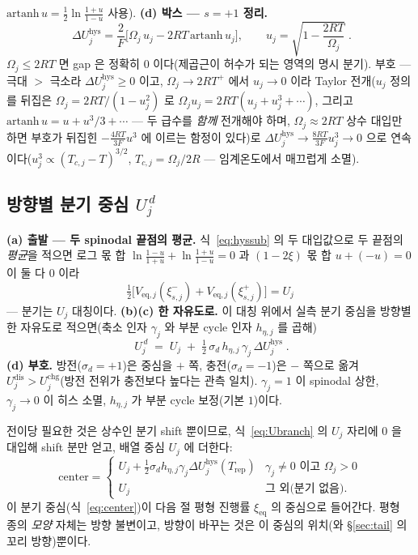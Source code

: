 \documentclass[11pt,a4paper]{article}
\newcommand{\eq}{\mathrm{eq}}
\newcommand{\dis}{\mathrm{dis}}
\newcommand{\chg}{\mathrm{chg}}
\newcommand{\hys}{\mathrm{hys}}
\newcommand{\rep}{\mathrm{rep}}
\begin{document}
$\mathrm{artanh}\,u=\tfrac12\ln\tfrac{1+u}{1-u}$ 사용). \textbf{(d) 박스 — $s=+1$ 정리.}
\begin{equation}
\boxed{\;\Delta U_j^\hys
=\frac{2}{F}\Big[\Omega_j\,u_j-2RT\,\mathrm{artanh}\,u_j\Big],
\qquad u_j=\sqrt{1-\frac{2RT}{\Omega_j}}\;.}
\label{eq:dUhys}
\end{equation}
$\Omega_j\le2RT$ 면 gap 은
정확히 $0$ 이다(제곱근이 허수가 되는 영역의 명시 분기). 부호 — 극대 $>$ 극소라 $\Delta U_j^\hys\ge0$ 이고, $\Omega_j\to2RT^+$ 에서
$u_j\to0$ 이라 Taylor 전개($u_j$ 정의를 뒤집은 $\Omega_j=2RT/(1-u_j^2)$ 로
$\Omega_ju_j=2RT(u_j+u_j^3+\cdots)$, 그리고 $\mathrm{artanh}\,u=u+u^3/3+\cdots$ — 두 급수를 \emph{함께}
전개해야 하며, $\Omega_j\approx2RT$ 상수 대입만 하면 부호가 뒤집힌 $-\tfrac{4RT}{3F}u^3$ 에 이르는 함정이
있다)로 $\Delta U_j^\hys\to\frac{8RT}{3F}u_j^3\to0$ 으로
연속이다($u_j^3\propto(T_{c,j}-T)^{3/2}$, $T_{c,j}=\Omega_j/2R$ — 임계온도에서 매끄럽게 소멸).

\subsection{방향별 분기 중심 $U_j^{\,d}$}
\textbf{(a) 출발 — 두 spinodal 끝점의 평균.} 식~\eqref{eq:hyssub} 의 두 대입값으로 두 끝점의 \emph{평균}을 적으면
로그 몫 합 $\ln\frac{1-u}{1+u}+\ln\frac{1+u}{1-u}=0$ 과 $(1-2\xi)$ 몫 합 $u+(-u)=0$ 이 둘 다 $0$ 이라
\begin{equation}
\tfrac12\big[V_{\eq,j}(\xi_{s,j}^-)+V_{\eq,j}(\xi_{s,j}^+)\big]=U_j
\label{eq:hyssym}
\end{equation}
— 분기는 $U_j$ 대칭이다. \textbf{(b)(c) 한 자유도로.} 이 대칭 위에서 실측 분기 중심을 방향별 한 자유도로 적으면(축소
인자 $\gamma_j$ 와 부분 cycle 인자 $h_{\eta,j}$ 를 곱해)
\begin{equation}
\boxed{\;U_j^{\,d}\;=\;U_j\;+\;\tfrac12\,\sigma_d\,h_{\eta,j}\,\gamma_j\,\Delta U_j^\hys\;.}
\label{eq:Ubranch}
\end{equation}
\textbf{(d) 부호.} 방전($\sigma_d=+1$)은 중심을
$+$ 쪽, 충전($\sigma_d=-1$)은 $-$ 쪽으로 옮겨 $U_j^{\dis}>U_j^{\chg}$(방전 전위가 충전보다 높다는 관측 일치).
$\gamma_j=1$ 이 spinodal 상한, $\gamma_j\to0$ 이 히스 소멸, $h_{\eta,j}$ 가 부분 cycle 보정(기본 $1$)이다.

전이당 필요한 것은 상수인 분기 shift 뿐이므로, 식~\eqref{eq:Ubranch} 의 $U_j$ 자리에 $0$ 을 대입해 shift
분만 얻고, 배열 중심 $U_j$ 에 더한다:
\begin{equation}
\mathrm{center}=
\begin{cases}
U_j+\tfrac12\sigma_d h_{\eta,j}\gamma_j\Delta U_j^\hys(T_\rep) & \gamma_j\ne0 \text{ 이고 } \Omega_j>0\\[2pt]
U_j & \text{그 외(분기 없음)}.
\end{cases}
\label{eq:center}
\end{equation}
이 분기 중심(식~\eqref{eq:center})이 다음 절 평형 진행률 $\xi_\eq$ 의 중심으로 들어간다. 평형 종의 \emph{모양} 자체는 방향 불변이고,
방향이 바꾸는 것은 이 중심의 위치(와 \S\ref{sec:tail} 의 꼬리 방향)뿐이다.
\end{document}
